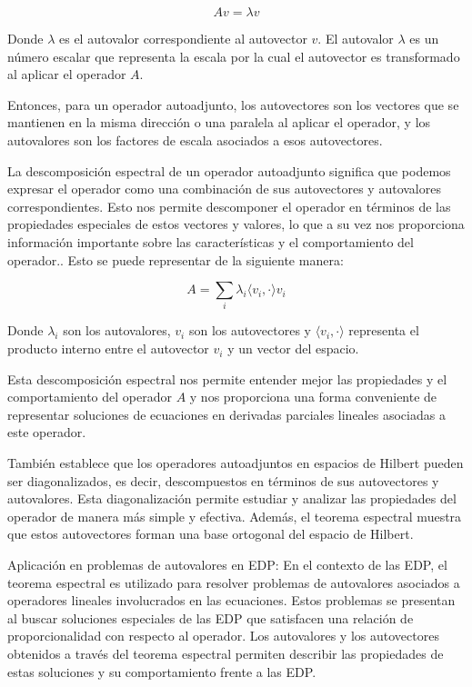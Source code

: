 \documentclass{article}
\begin{document}
    \begin{equation}
    Av = \lambda v
    \end{equation}
    
    Donde $\lambda$ es el autovalor correspondiente al autovector $v$. El autovalor $\lambda$ es un número escalar que representa la escala por la cual el autovector es transformado al aplicar el operador $A$.
    
    Entonces, para un operador autoadjunto, los autovectores son los vectores que se mantienen en la misma dirección o una paralela al aplicar el operador, y los autovalores son los factores de escala asociados a esos autovectores.
    
    La descomposición espectral de un operador autoadjunto significa que podemos expresar el operador como una combinación de sus autovectores y autovalores correspondientes. Esto nos permite descomponer el operador en términos de las propiedades especiales de estos vectores y valores, lo que a su vez nos proporciona información importante sobre las características y el comportamiento del operador.. Esto se puede representar de la siguiente manera:
    
    \begin{equation}
    A = \sum_{i} \lambda_i \langle v_i, \cdot \rangle v_i
    \end{equation}
    
    Donde $\lambda_i$ son los autovalores, $v_i$ son los autovectores y $\langle v_i, \cdot \rangle$ representa el producto interno entre el autovector $v_i$ y un vector del espacio.
    
    Esta descomposición espectral nos permite entender mejor las propiedades y el comportamiento del operador $A$ y nos proporciona una forma conveniente de representar soluciones de ecuaciones en derivadas parciales lineales asociadas a este operador.
    
    También establece que los operadores autoadjuntos en espacios de Hilbert pueden ser diagonalizados, es decir, descompuestos en términos de sus autovectores y autovalores. Esta diagonalización permite estudiar y analizar las propiedades del operador de manera más simple y efectiva. Además, el teorema espectral muestra que estos autovectores forman una base ortogonal del espacio de Hilbert.

    Aplicación en problemas de autovalores en EDP: En el contexto de las EDP, el teorema espectral es utilizado para resolver problemas de autovalores asociados a operadores lineales involucrados en las ecuaciones. Estos problemas se presentan al buscar soluciones especiales de las EDP que satisfacen una relación de proporcionalidad con respecto al operador. Los autovalores y los autovectores obtenidos a través del teorema espectral permiten describir las propiedades de estas soluciones y su comportamiento frente a las EDP.
\end{document}
